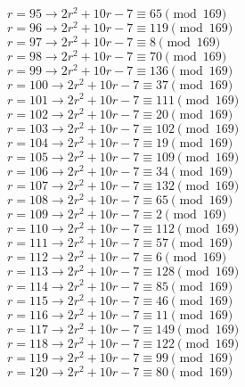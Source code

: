 \documentclass[12pt]{article}
\begin{document}
\begin{itemize}
\begin{multicols}{2}
$r = 95 \rightarrow 2r^2 + 10r - 7 \equiv 65 \pmod{169}$ \\
$r = 96 \rightarrow 2r^2 + 10r - 7 \equiv 119 \pmod{169}$ \\
$r = 97 \rightarrow 2r^2 + 10r - 7 \equiv 8 \pmod{169}$ \\
$r = 98 \rightarrow 2r^2 + 10r - 7 \equiv 70 \pmod{169}$ \\
$r = 99 \rightarrow 2r^2 + 10r - 7 \equiv 136 \pmod{169}$ \\
$r = 100 \rightarrow 2r^2 + 10r - 7 \equiv 37 \pmod{169}$ \\
$r = 101 \rightarrow 2r^2 + 10r - 7 \equiv 111 \pmod{169}$ \\
$r = 102 \rightarrow 2r^2 + 10r - 7 \equiv 20 \pmod{169}$ \\
$r = 103 \rightarrow 2r^2 + 10r - 7 \equiv 102 \pmod{169}$ \\
$r = 104 \rightarrow 2r^2 + 10r - 7 \equiv 19 \pmod{169}$ \\
$r = 105 \rightarrow 2r^2 + 10r - 7 \equiv 109 \pmod{169}$ \\
$r = 106 \rightarrow 2r^2 + 10r - 7 \equiv 34 \pmod{169}$ \\
$r = 107 \rightarrow 2r^2 + 10r - 7 \equiv 132 \pmod{169}$ \\
$r = 108 \rightarrow 2r^2 + 10r - 7 \equiv 65 \pmod{169}$ \\
$r = 109 \rightarrow 2r^2 + 10r - 7 \equiv 2 \pmod{169}$ \\
$r = 110 \rightarrow 2r^2 + 10r - 7 \equiv 112 \pmod{169}$ \\
$r = 111 \rightarrow 2r^2 + 10r - 7 \equiv 57 \pmod{169}$ \\
$r = 112 \rightarrow 2r^2 + 10r - 7 \equiv 6 \pmod{169}$ \\
$r = 113 \rightarrow 2r^2 + 10r - 7 \equiv 128 \pmod{169}$ \\
$r = 114 \rightarrow 2r^2 + 10r - 7 \equiv 85 \pmod{169}$ \\
$r = 115 \rightarrow 2r^2 + 10r - 7 \equiv 46 \pmod{169}$ \\
$r = 116 \rightarrow 2r^2 + 10r - 7 \equiv 11 \pmod{169}$ \\
$r = 117 \rightarrow 2r^2 + 10r - 7 \equiv 149 \pmod{169}$ \\
$r = 118 \rightarrow 2r^2 + 10r - 7 \equiv 122 \pmod{169}$ \\
$r = 119 \rightarrow 2r^2 + 10r - 7 \equiv 99 \pmod{169}$ \\
$r = 120 \rightarrow 2r^2 + 10r - 7 \equiv 80 \pmod{169}$ \\

\end{multicols}
\end{itemize}
\end{document}
